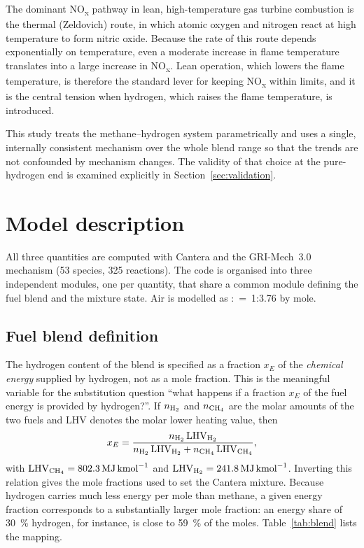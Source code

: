 \documentclass[11pt,a4paper]{article}
\begin{document}
The dominant NO\textsubscript{x} pathway in lean, high-temperature gas
turbine combustion is the thermal (Zeldovich) route, in which atomic oxygen
and nitrogen react at high temperature to form nitric oxide. Because the rate
of this route depends exponentially on temperature, even a moderate increase
in flame temperature translates into a large increase in NO\textsubscript{x}.
Lean operation, which lowers the flame temperature, is therefore the standard
lever for keeping NO\textsubscript{x} within limits, and it is the central
tension when hydrogen, which raises the flame temperature, is introduced.

This study treats the methane--hydrogen system parametrically and uses a
single, internally consistent mechanism over the whole blend range so that
the trends are not confounded by mechanism changes. The validity of that
choice at the pure-hydrogen end is examined explicitly in
Section~\ref{sec:validation}.

\section{Model description}

All three quantities are computed with Cantera and the GRI-Mech~3.0
mechanism (53 species, 325 reactions). The code is organised into three
independent modules, one per quantity, that share a common module defining
the fuel blend and the mixture state. Air is modelled as
:~=~1:3.76 by mole.

\subsection{Fuel blend definition}

The hydrogen content of the blend is specified as a fraction $x_E$ of the
\emph{chemical energy} supplied by hydrogen, not as a mole fraction. This is
the meaningful variable for the substitution question ``what happens if a
fraction $x_E$ of the fuel energy is provided by hydrogen?''. If $n_{\ce{H2}}$
and $n_{\ce{CH4}}$ are the molar amounts of the two fuels and $\mathrm{LHV}$
denotes the molar lower heating value, then
%
\begin{equation}
x_E = \frac{n_{\ce{H2}}\,\mathrm{LHV}_{\ce{H2}}}
{n_{\ce{H2}}\,\mathrm{LHV}_{\ce{H2}} + n_{\ce{CH4}}\,\mathrm{LHV}_{\ce{CH4}}},
\end{equation}
%
with $\mathrm{LHV}_{\ce{CH4}}=\SI{802.3}{\mega\joule\per\kilo\mole}$ and
$\mathrm{LHV}_{\ce{H2}}=\SI{241.8}{\mega\joule\per\kilo\mole}$. Inverting this
relation gives the mole fractions used to set the Cantera mixture. Because
hydrogen carries much less energy per mole than methane, a given energy
fraction corresponds to a substantially larger mole fraction: an energy share
of \SI{30}{\percent} hydrogen, for instance, is close to \SI{59}{\percent} of
the moles. Table~\ref{tab:blend} lists the mapping.
\end{document}
